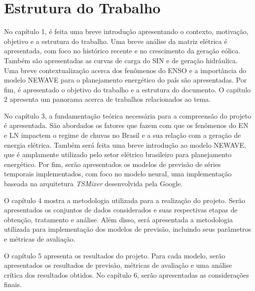\section{Estrutura do Trabalho}
No capítulo 1, é feita uma breve introdução apresentando o contexto, motivação, objetivo e a estrutura do trabalho. Uma
breve análise da matriz elétrica é apresentada, com foco no histórico recente e no crescimento da geração eólica. Também
são apresentadas as curvas de carga do SIN e de geração hidráulica. Uma breve contextualização acerca dos fenômenos do
ENSO e a importância do modelo NEWAVE para o planejamento energético do país são apresentadas. Por fim, é apresentado
o objetivo do trabalho e a estrutura do documento. O capítulo 2 apresenta um panorama acerca de trabalhos relacionados ao tema.

No capítulo 3, a fundamentação teórica necessária para a compreensão do projeto é apresentada. São abordados os fatores
que fazem com que os fenômenos do EN e LN impactem o regime de chuvas no Brasil e a sua relação com a geração de 
energia elétrica. Também será feita uma breve introdução ao modelo NEWAVE,
que é amplamente utilizado pelo setor elétrico brasileiro para planejamento energético. Por fim, serão apresentados os modelos 
de previsão de séries temporais implementados, com foco no modelo neural, uma implementação baseada na arquitetura 
\textit{TSMixer} desenvolvida pela Google.

O capítulo 4 mostra a metodologia utilizada para a realização do projeto. Serão apresentados os conjuntos de dados
considerados e suas respectivas etapas de obtenção, tratamento e análise. Além disso, será apresentada a metodologia
utilizada para implementação dos modelos de previsão, incluindo seus parâmetros e métricas de avaliação.

O capítulo 5 apresenta os resultados do projeto. Para cada modelo, serão apresentados os resultados de previsão, métricas 
de avaliação e uma análise crítica dos resultados obtidos. No capítulo 6, serão apresentadas as considerações finais.



